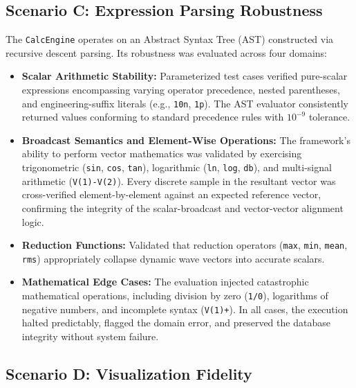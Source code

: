 \subsection{Scenario C: Expression Parsing Robustness}
\label{sec:calc-verify}

The \texttt{CalcEngine} operates on an Abstract Syntax Tree (AST) constructed via recursive descent parsing. Its robustness was evaluated across four domains:

\begin{itemize}
    \item \textbf{Scalar Arithmetic Stability:} Parameterized test cases verified pure-scalar expressions encompassing varying operator precedence, nested parentheses, and engineering-suffix literals (e.g., \texttt{10n}, \texttt{1p}). The AST evaluator consistently returned values conforming to standard precedence rules with $10^{-9}$ tolerance.
    \item \textbf{Broadcast Semantics and Element-Wise Operations:} The framework's ability to perform vector mathematics was validated by exercising trigonometric (\texttt{sin}, \texttt{cos}, \texttt{tan}), logarithmic (\texttt{ln}, \texttt{log}, \texttt{db}), and multi-signal arithmetic (\texttt{V(1)-V(2)}). Every discrete sample in the resultant vector was cross-verified element-by-element against an expected reference vector, confirming the integrity of the scalar-broadcast and vector-vector alignment logic.
    \item \textbf{Reduction Functions:} Validated that reduction operators (\texttt{max}, \texttt{min}, \texttt{mean}, \texttt{rms}) appropriately collapse dynamic wave vectors into accurate scalars.
    \item \textbf{Mathematical Edge Cases:} The evaluation injected catastrophic mathematical operations, including division by zero (\texttt{1/0}), logarithms of negative numbers, and incomplete syntax (\texttt{V(1)+}). In all cases, the execution halted predictably, flagged the domain error, and preserved the database integrity without system failure.
\end{itemize}

\subsection{Scenario D: Visualization Fidelity}
\label{sec:plot-verify}

